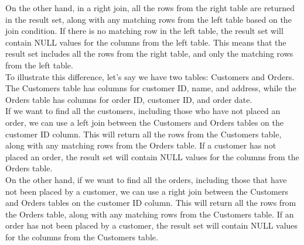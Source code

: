 \documentclass{article}
\begin{document}
On the other hand, in a right join, all the rows from the right table are returned in the result set, along with any matching rows from the left table based on the join condition. If there is no matching row in the left table, the result set will contain NULL values for the columns from the left table. This means that the result set includes all the rows from the right table, and only the matching rows from the left table.\\

To illustrate this difference, let's say we have two tables: Customers and Orders. The Customers table has columns for customer ID, name, and address, while the Orders table has columns for order ID, customer ID, and order date.\\

If we want to find all the customers, including those who have not placed an order, we can use a left join between the Customers and Orders tables on the customer ID column. This will return all the rows from the Customers table, along with any matching rows from the Orders table. If a customer has not placed an order, the result set will contain NULL values for the columns from the Orders table.\\

On the other hand, if we want to find all the orders, including those that have not been placed by a customer, we can use a right join between the Customers and Orders tables on the customer ID column. This will return all the rows from the Orders table, along with any matching rows from the Customers table. If an order has not been placed by a customer, the result set will contain NULL values for the columns from the Customers table.
\end{document}
